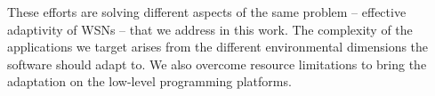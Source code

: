 These efforts are solving different aspects of the same problem -- effective
adaptivity of WSNs -- that we address in this work. The complexity of the
applications we target arises from the different environmental dimensions the
software should adapt to. We also overcome resource limitations to bring the
adaptation on the low-level programming platforms.

